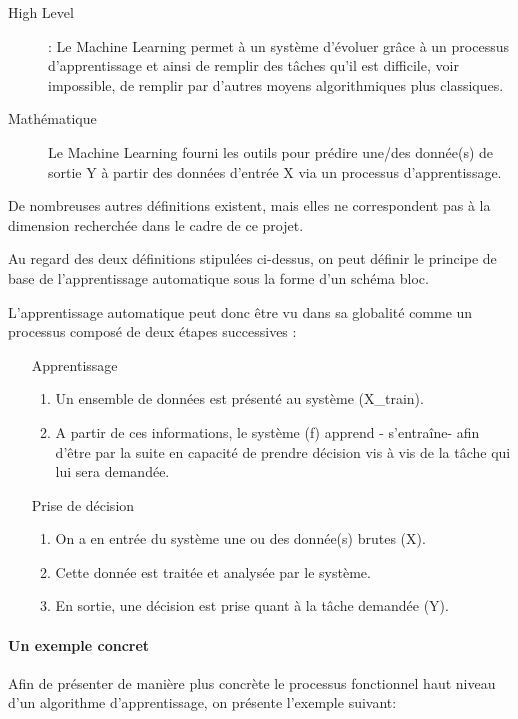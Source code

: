 \begin{description}
	\item[High Level]: Le Machine Learning permet à un système d'évoluer grâce à un processus d'apprentissage et ainsi de remplir des tâches qu'il est difficile, voir impossible, de remplir par d'autres moyens algorithmiques plus classiques. 
	\item[Mathématique] Le Machine Learning fourni les outils pour prédire une/des donnée(s) de sortie Y à partir des données d'entrée X via un processus d'apprentissage. 
\end{description}
 
 De nombreuses autres définitions existent, mais elles ne correspondent pas à la dimension recherchée dans le cadre de ce projet.
 
Au regard des deux définitions stipulées ci-dessus, on peut définir le principe de base de l'apprentissage automatique sous la forme d'un schéma bloc.

L'apprentissage automatique peut donc être vu dans sa globalité comme un processus composé de deux étapes successives : 
\begin{enumerate}
		\item [Apprentissage]
		 \begin{enumerate}
			\item  Un ensemble de données est présenté au système (X\_train).
			\item A partir de ces informations, le système (f) apprend - s'entraîne- afin d'être par la suite en capacité de prendre décision vis à vis de la tâche qui lui sera demandée. 
		\end{enumerate}
		
		\item [Prise de décision] 
		\begin{enumerate}
			\item  On a en entrée du système une ou des donnée(s) brutes (X).  
			\item Cette donnée est traitée et analysée par le système.
			\item En sortie, une décision est prise quant à la tâche demandée (Y). 
		\end{enumerate}
\end{enumerate}

\paragraph{Un exemple concret}
\label{Le Machine Learning: Généralités sur le Machine Learning: Définition et principe général:un exemple concret}
Afin de présenter de manière plus concrète le processus fonctionnel haut niveau d'un algorithme d'apprentissage, on présente l'exemple suivant:

